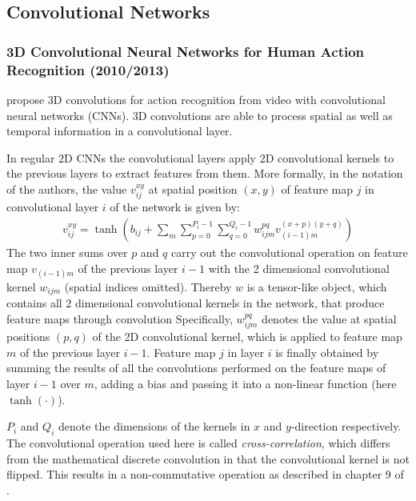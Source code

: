 \subsection{Convolutional Networks}

\subsubsection{3D Convolutional Neural Networks for Human Action Recognition (2010/2013)}

\textcite{ji_3d_2013} propose 3D convolutions for action recognition from video with convolutional neural networks (CNNs).
3D convolutions are able to process spatial as well as temporal information in a convolutional layer.

In regular 2D CNNs the convolutional layers apply 2D convolutional kernels to the previous layers to extract features from them.
More formally, in the notation of the authors, the value $v_{ij}^{xy}$ at spatial position $(x,y)$ of feature map $j$ in convolutional layer $i$ of the network is given by:
\begin{align*}
    v_{ij}^{xy} = \tanh \left( b_{ij} + \sum_m \sum_{p=0}^{P_i -1} \sum_{q = 0}^{Q_i - 1} w_{ijm}^{pq} v_{(i-1)m}^{(x+p)(y+q)} \right)
\end{align*}
The two inner sums over $p$ and $q$ carry out the convolutional operation on feature map $v_{(i-1)m}$ of the previous layer $i-1$ with the 2 dimensional convolutional kernel $w_{ijm}$ (spatial indices omitted).
Thereby $w$ is a tensor-like object, which contains all 2 dimensional convolutional kernels in the network, that produce feature maps through convolution
Specifically, $w_{ijm}^{pq}$ denotes the value at spatial positions $(p,q)$ of the 2D convolutional kernel, which is applied to feature map $m$ of the previous layer $i-1$.
Feature map $j$ in layer $i$ is finally obtained by summing the results of all the convolutions performed on the feature maps of layer $i-1$ over $m$, adding a bias and passing it into a non-linear function (here $\tanh(\cdot)$).

$P_i$ and $Q_i$ denote the dimensions of the kernels in $x$ and $y$-direction respectively.
The convolutional operation used here is called \textit{cross-correlation}, which differs from the mathematical discrete convolution in that the convolutional kernel is not flipped. This results in a non-commutative operation as described in chapter 9 of \cite{goodfellow_deep_2016}.

